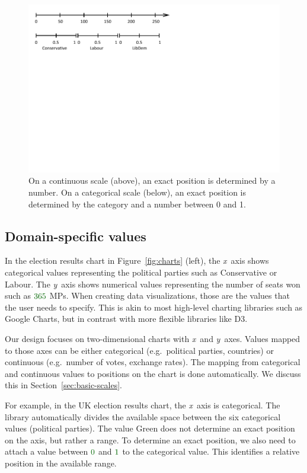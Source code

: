 \documentclass{jfp}
\newcommand{\X}{\emph{x}\ }
\newcommand{\Y}{\emph{y}\ }
\newcommand{\num}[1]{\textcolor{numclr}{#1}}
\newcommand{\strf}[1]{\textnormal{\textcolor{strclr}{\sffamily #1}}}
\begin{document}
\begin{figure}[t]
\includegraphics[scale=1,trim={0cm 6.9cm 6cm 0cm},clip]{figures/values.pdf}
\caption{On a continuous scale (above), an exact position is determined by a number.
  On a categorical scale (below), an exact position is determined by the category and a
  number between 0 and 1.}
\label{fig:scales}
\end{figure}

\subsection{Domain-specific values}

In the election results chart in Figure~\ref{fig:charts} (left), the \X axis shows categorical
values representing the political parties such as \strf{Conservative} or \strf{Labour}. The
\Y axis shows numerical values representing the number of seats won such as $\num{365}$ MPs.
When creating data visualizations, those are the values that the user needs to specify. This is
akin to most high-level charting libraries such as Google Charts, but in contrast with more
flexible libraries like D3.

Our design focuses on two-dimensional charts with \X and \Y axes. Values mapped to those axes
can be either categorical (e.g.~political parties, countries) or continuous
(e.g.~number of votes, exchange rates). The mapping from categorical and continuous values
to positions on the chart is done automatically. We discuss this in Section~\ref{sec:basic-scales}.

For example, in the UK election results chart, the \X axis is categorical. The library automatically
divides the available space between the six categorical values (political parties). The value
\strf{Green} does not determine an exact position on the axis, but rather a range. To determine
an exact position, we also need to attach a value between $\num{0}$ and $\num{1}$ to the
categorical value. This identifies a relative position in the available range.
\end{document}
